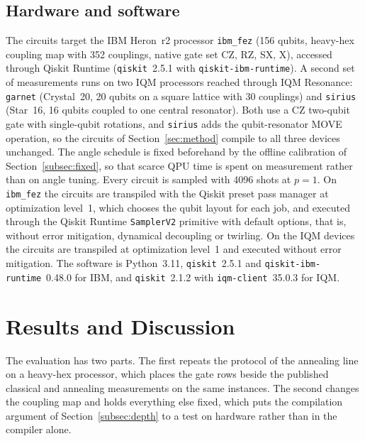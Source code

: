 \documentclass{svproc}
\newcommand{\rev}[1]{{\color{blue}#1}}
\newcommand{\rev}[1]{#1}
\begin{document}
\subsection{Hardware and software}
\label{subsec:hw}
The circuits target the IBM Heron~r2 processor \texttt{ibm\_fez} (156
qubits, heavy-hex coupling map with 352 couplings, native gate set CZ, RZ,
SX, X), accessed through Qiskit Runtime (\texttt{qiskit}~2.5.1 with
\texttt{qiskit-ibm-runtime}). A second set of measurements runs on two IQM
processors reached through IQM Resonance: \texttt{garnet} (Crystal~20, 20
qubits on a square lattice with 30 couplings) and \texttt{sirius} (Star~16,
16 qubits coupled to one central resonator). Both use a CZ two-qubit gate
with single-qubit rotations, and \texttt{sirius} adds the qubit-resonator
MOVE operation, so the circuits of Section~\ref{sec:method} compile to all
three devices unchanged. The angle schedule is fixed beforehand by the
offline calibration of Section~\ref{subsec:fixed}, so that scarce QPU time is
spent on measurement rather than on angle tuning. \rev{Every circuit is sampled
with 4096 shots at $p=1$. On \texttt{ibm\_fez} the circuits are transpiled with
the Qiskit preset pass manager at optimization level~1, which chooses the qubit
layout for each job, and executed through the Qiskit Runtime \texttt{SamplerV2}
primitive with default options, that is, without error mitigation, dynamical
decoupling or twirling. On the IQM devices the circuits are transpiled at
optimization level~1 and executed without error mitigation. The software is
Python~3.11, \texttt{qiskit}~2.5.1 and \texttt{qiskit-ibm-runtime}~0.48.0 for
IBM, and \texttt{qiskit}~2.1.2 with \texttt{iqm-client}~35.0.3 for IQM.}

\section{Results and Discussion}
\label{sec:results}
The evaluation has two parts. The first repeats the protocol of the annealing
line on a heavy-hex processor, which places the gate rows beside the published
classical and annealing measurements on the same instances. The second changes
the coupling map and holds everything else fixed, which puts the compilation
argument of Section~\ref{subsec:depth} to a test on hardware rather than in
the compiler alone.
\end{document}
